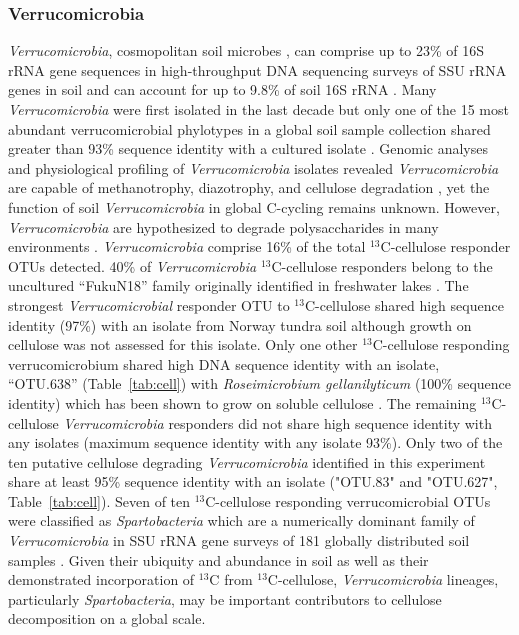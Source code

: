\subsubsection{Verrucomicrobia}\label{cell:verruc}
\textit{Verrucomicrobia}, cosmopolitan soil microbes
\citep{Bergmann_2011}, can comprise up to 23\% of 16S rRNA gene sequences in
high-throughput DNA sequencing surveys of SSU rRNA genes in soil
\citep{Bergmann_2011} and can account for up to 9.8\% of
soil 16S rRNA \citep{Buckley_2001}. Many \textit{Verrucomicrobia} were first
isolated in the last decade \cite{Wertz_2011} but only one of the 15 most
abundant verrucomicrobial phylotypes in a global soil sample collection shared
greater than 93\% sequence identity with a cultured isolate
\citep{Bergmann_2011}. Genomic analyses and physiological profiling of
\textit{Verrucomicrobia} isolates revealed \textit{Verrucomicrobia} are capable
of methanotrophy, diazotrophy, and cellulose degradation \citep{Otsuka_2012,
Wertz_2011}, yet the function of soil \textit{Verrucomicrobia} in global
C-cycling remains unknown. However, \textit{Verrucomicrobia} are hypothesized
to degrade polysaccharides in many environments
\citep{Fierer_2013,Herlemann_2013,10543821}. \textit{Verrucomicrobia} comprise
16\% of the total $^{13}$C-cellulose responder OTUs detected. 40\% of
\textit{Verrucomicrobia} $^{13}$C-cellulose responders belong to the uncultured
``FukuN18'' family originally identified in freshwater lakes
\citep{Parveen_2013}.  The strongest \textit{Verrucomicrobial} responder OTU to
$^{13}$C-cellulose shared high sequence identity (97\%) with an isolate from
Norway tundra soil \citep{Jiang_2011} although growth on cellulose was not
assessed for this isolate. Only one other $^{13}$C-cellulose responding
verrucomicrobium shared high DNA sequence identity with an isolate, ``OTU.638''
(Table~\ref{tab:cell}) with \textit{Roseimicrobium gellanilyticum} (100\%
sequence identity) which has been shown to grow on soluble cellulose
\citep{Otsuka_2012}. The remaining $^{13}$C-cellulose \textit{Verrucomicrobia}
responders did not share high sequence identity with any isolates (maximum
sequence identity with any isolate 93\%). Only two of the ten putative
cellulose degrading \textit{Verrucomicrobia} identified in this experiment
share at least 95\% sequence identity with an isolate ("OTU.83" and "OTU.627",
Table~\ref{tab:cell}). Seven of ten $^{13}$C-cellulose responding
verrucomicrobial OTUs were classified as \textit{Spartobacteria} which are
a numerically dominant family of \textit{Verrucomicrobia} in SSU rRNA gene
surveys of 181 globally distributed soil samples \citep{Bergmann_2011}. Given
their ubiquity and abundance in soil as well as their demonstrated
incorporation of $^{13}$C from $^{13}$C-cellulose, \textit{Verrucomicrobia}
lineages, particularly \textit{Spartobacteria}, may be important contributors
to cellulose decomposition on a global scale.

